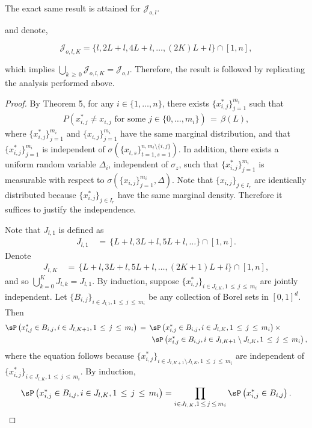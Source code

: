 \documentclass[twoside,11pt]{article}
\makeatletter
\newcommand{\discardlabel}[1]{}
\newcommand{\discardtwo}[2]{}
\newcommand{\legacyref}[1]{\textup{[source ref.]}}
\newcommand{\legacyeqref}[1]{\textup{[source equation]}}
\newenvironment{legacycomparison}{%
  \begingroup\color{legacygray}%
  \let\label\discardlabel
  \let\originallabel\discardlabel
  \let\ref\legacyref
  \let\pageref\legacyref
  \let\eqref\legacyeqref
  \let\cref\legacyref
  \let\Cref\legacyref
  \let\autoref\legacyref
  \let\aliasref\discardtwo
}{\endgroup}
\newcommand{\aliasref}[2]{%
  \@ifundefined{r@#2}{}{%
    \expandafter\let\csname r@#1\expandafter\endcsname\csname r@#2\endcsname}}
\makeatother
\begin{document}
\begin{legacycomparison}
\begin{lemma}
The exact same result is attained for \(\mathcal{J}_{o,l}\).

and denote,

\[
\mathcal{J}_{o,l,K} = \{l, 2L + l, 4L + l, \ldots, (2K)L + l\} \cap [1,n],
\]

which implies \(\bigcup_{k \,\geq\, 0}\mathcal{J}_{o,l,K} = \mathcal{J}_{o,l}\). Therefore, the result is followed by replicating the analysis performed above.
\end{lemma}
 


\begin{proof} By Theorem 5, for any $i \in \{1, \ldots, n\}$, there exists $\{x_{i,j}^*\}_{j=1}^{m_i}$ such that
\begin{align}
    P(x_{i,j}^* \neq x_{i,j} \text{ for some } j \in \{0, \ldots, m_i\}) \,=\, \beta(L), \label{eq:264}
\end{align}
where $\{x_{i,j}^*\}_{j=1}^{m_i}$ and $\{x_{i,j}\}_{j=1}^{m_i}$ have the same marginal distribution, and that $\{x_{i,j}^*\}_{j=1}^{m_i}$ is independent of $\sigma(\{x_{t,s}\}_{t=1,s=1}^{n,m_t \setminus \{i,j\}})$. In addition, there exists a uniform random variable $\Delta_i$, independent of $\sigma_z$, such that $\{x_{i,j}^*\}_{j=1}^{m_i}$ is measurable with respect to $\sigma(\{x_{i,j}\}_{j=1}^{m_i}, \Delta)$. Note that $\{x_{i,j}\}_{j\in I_{r}}$ are identically distributed because $\{x_{i,j}^*\}_{j\in I_{r}}$ have the same marginal density. Therefore it suffices to justify the independence.

Note that $J_{l,1}$ is defined as
\begin{align}
    J_{l,1} &\,=\, \{L + l, 3L + l, 5L + l, \ldots \} \cap [1,n].
\end{align}
Denote
\begin{align}
    J_{l,K} &\,=\, \{L + l, 3L + l, 5L + l, \ldots, (2K + 1)L + l\} \cap [1,n],
\end{align}
and so $\bigcup_{k=0}^{K}J_{l,k} = J_{l,1}$. By induction, suppose $\{x_{i,j}^*\}_{i\in J_{l,K}, 1\,\leq\, j \,\leq\, m_i}$ are jointly independent. Let $\{B_{i,j}\}_{i\in J_{l,1},1\,\leq\, j\,\leq\, m_i}$ be any collection of Borel sets in $[0,1]^d$. Then
\begin{align}
    \sP\left( x_{i,j}^* \in B_{i,j}, i \in J_{l,K+1}, 1 \,\leq\, j \,\leq\, m_i \right) 
    &\,=\, \sP\left( x_{i,j}^* \in B_{i,j}, i \in J_{l,K}, 1 \,\leq\, j \,\leq\, m_i \right) \times \nonumber \\
    & \qquad \sP\left( x_{i,j}^* \in B_{i,j}, i \in J_{l,K+1}\setminus J_{l,K}, 1 \,\leq\, j \,\leq\, m_i \right), \label{eq:induction_step}
\end{align}
where the equation follows because $\{x_{i,j}^*\}_{i\in J_{l,K+1}\setminus J_{l,K}, 1\,\leq\, j\,\leq\, m_i}$ are independent of $\{x_{i,j}^*\}_{i\in J_{l,K}, 1\,\leq\, j\,\leq\, m_i}$. By induction,
\begin{align}
    \sP\left( x_{i,j}^* \in B_{i,j}, i \in J_{l,K}, 1 \,\leq\, j \,\leq\, m_i \right) 
    = \prod_{i\in J_{l,K}, 1\,\leq\, j\,\leq\, m_i} \sP\left( x_{i,j}^* \in B_{i,j} \right).
\end{align}


\end{proof}
\end{legacycomparison}
\end{document}
